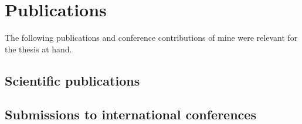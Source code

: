 
\chapter{Publications}

The following publications and conference contributions of mine were relevant for the thesis at hand.


\section*{Scientific publications}
\begin{refsection}
\nocite{Halchenko2021, NISO2022119623, HankePestilliWagnerMarkiewiczPolineHalchenko+2021+17+25, wagner2020datalad, wagner2022fairly}
\begin{refcontext}[sorting=nyt]  
	\printbibliography[heading=none, resetnumbers=true]
\end{refcontext}
\end{refsection}

\section*{Submissions to international conferences}
\begin{refsection}
\nocite{wagner202310, wagnerohbm2022, wagnerohbm2021, poldrackohbm2020, wagner_adina_s_2020_7906718}

\begin{refcontext}[sorting=nyt]  
	\printbibliography[heading=none, resetnumbers=true]
\end{refcontext}
\end{refsection}

